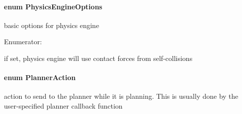 \hypertarget{namespaceOpenRAVE_a5ab12d9ae992912f730cfefda6c97042}{
\paragraph[{PhysicsEngineOptions}]{\setlength{\rightskip}{0pt plus 5cm}enum {\bf PhysicsEngineOptions}}\hfill}
\label{namespaceOpenRAVE_a5ab12d9ae992912f730cfefda6c97042}


basic options for physics engine 

\begin{Desc}
\item[Enumerator: ]\par
\begin{description}
\item[{\em 
\hypertarget{namespaceOpenRAVE_a5ab12d9ae992912f730cfefda6c97042ac6a259c2e3176f579d27d30003166e17}{
PEO\_\-SelfCollisions}
\label{namespaceOpenRAVE_a5ab12d9ae992912f730cfefda6c97042ac6a259c2e3176f579d27d30003166e17}
}]if set, physics engine will use contact forces from self-\/collisions \end{description}
\end{Desc}

\hypertarget{namespaceOpenRAVE_a16104fe58cdf1075c47eb709e58ba853}{
\paragraph[{PlannerAction}]{\setlength{\rightskip}{0pt plus 5cm}enum {\bf PlannerAction}}\hfill}
\label{namespaceOpenRAVE_a16104fe58cdf1075c47eb709e58ba853}


action to send to the planner while it is planning. This is usually done by the user-\/specified planner callback function 

